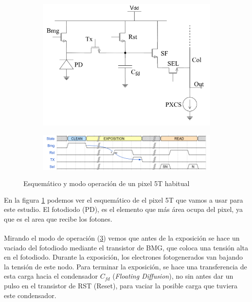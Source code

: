 \begin{figure}
	\centering
	\begin{subfigure}[b]{0.5\textwidth}
		\includegraphics[width=\textwidth]{img/pixel_5T.png}
		\caption{}
		\label{fig:pixel}
	\end{subfigure}

	\begin{subfigure}[b]{\textwidth}
		\includegraphics[width=\textwidth]{img/pixel_wave.png}
		\caption{}
		\label{fig:pixel_op}
	\end{subfigure}
	\caption{Esquemático y modo operación de un pixel 5T habitual}
\end{figure}

En la figura \ref{fig:pixel} podemos ver el esquemático de el pixel 5T
que vamos a usar para este estudio. El fotodiodo (PD), es el elemento que más
área ocupa del pixel, ya que es el area que recibe los fotones.

\paragraph{}
Mirando el modo de operación (\ref{fig:pixel_op}) vemos que antes de la exposición se hace un vaciado del
fotodiodo mediante el transistor de BMG, que coloca una tensión alta en el fotodiodo.
Durante la exposición, los electrones fotogenerados van bajando la tensión de este
nodo. Para terminar la exposición, se hace una transferencia de esta carga hacia
el condensador $C_{fd}$ (\textit{Floating Diffusion}), no sin antes dar un pulso
en el transistor de RST (Reset), para vaciar la posible carga que tuviera este condensador.

